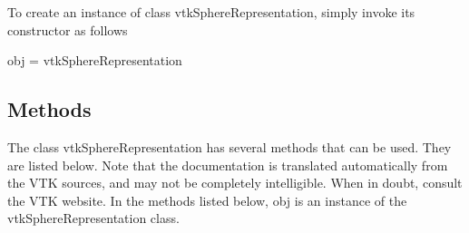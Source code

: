 To create an instance of class vtk\-Sphere\-Representation, simply invoke its constructor as follows \begin{DoxyVerb}  obj = vtkSphereRepresentation
\end{DoxyVerb}
 \hypertarget{vtkwidgets_vtkxyplotwidget_Methods}{}\subsection{Methods}\label{vtkwidgets_vtkxyplotwidget_Methods}
The class vtk\-Sphere\-Representation has several methods that can be used. They are listed below. Note that the documentation is translated automatically from the V\-T\-K sources, and may not be completely intelligible. When in doubt, consult the V\-T\-K website. In the methods listed below, {\ttfamily obj} is an instance of the vtk\-Sphere\-Representation class. 
